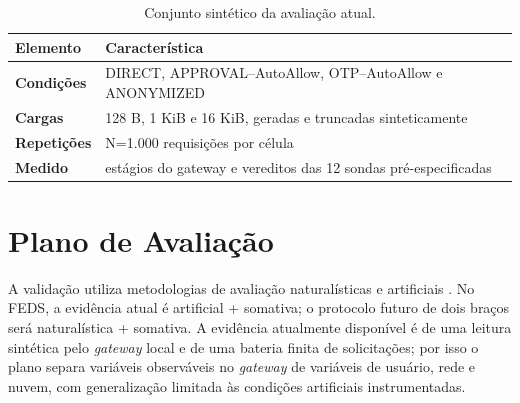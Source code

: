 \begin{table}[htbp]
\centering
\caption{Conjunto sintético da avaliação atual.}
\label{tab:dados-avaliacao}
\begin{tabularx}{\textwidth}{>{\bfseries}p{}X}
\toprule Elemento & Característica \\ \midrule
Condições & DIRECT, APPROVAL--AutoAllow, OTP--AutoAllow e ANONYMIZED \\
Cargas & 128 B, 1 KiB e 16 KiB, geradas e truncadas sinteticamente \\
Repetições & N=1.000 requisições por célula \\
Medido & estágios do gateway e vereditos das 12 sondas pré-especificadas \\
\bottomrule
\end{tabularx}
\end{table}

\section{Plano de Avaliação}
A validação utiliza metodologias de avaliação naturalísticas e artificiais \cite{venable2016}. No FEDS, a evidência atual é artificial + somativa; o protocolo futuro de dois braços será naturalística + somativa. A evidência atualmente disponível é de uma leitura sintética pelo \textit{gateway} local e de uma bateria finita de solicitações; por isso o plano separa variáveis observáveis no \textit{gateway} de variáveis de usuário, rede e nuvem, com generalização limitada às condições artificiais instrumentadas.

